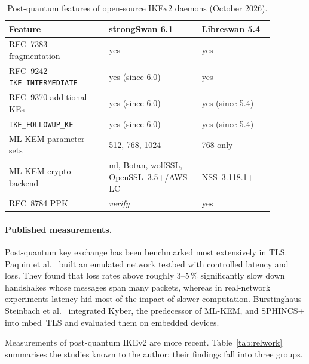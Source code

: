 \begin{table}[!h] \centering
    \caption{Post-quantum features of open-source IKEv2 daemons (October 2026).}
    \label{tab:impl}
    \begin{tabular}{| p{0.36\linewidth} | p{0.26\linewidth} | p{0.26\linewidth} |} \hline
        Feature & strongSwan 6.1 & Libreswan 5.4 \\ \hline\hline
        RFC~7383 fragmentation          & yes & yes \\ \hline
        RFC~9242 \texttt{IKE\_INTERMEDIATE} & yes (since 6.0) & yes \\ \hline
        RFC~9370 additional KEs         & yes (since 6.0) & yes (since 5.4) \\ \hline
        \texttt{IKE\_FOLLOWUP\_KE}      & yes (since 6.0) & yes (since 5.4) \\ \hline
        ML-KEM parameter sets           & 512, 768, 1024 & 768 only \\ \hline
        ML-KEM crypto backend           & ml, Botan, wolfSSL, OpenSSL~3.5+/AWS-LC & NSS~3.118.1+ \\ \hline
        RFC~8784 PPK                    & \textit{verify} & yes \\ \hline
    \end{tabular}
\end{table}

\paragraph{Published measurements.}
Post-quantum key exchange has been benchmarked most extensively in TLS.
Paquin et al.~\cite{paquin2020} built an emulated network testbed with
controlled latency and loss. They found that loss rates above roughly
3--5\,\% significantly slow down handshakes whose messages span many packets,
whereas in real-network experiments latency hid most of the impact of slower
computation.
Bürstinghaus-Steinbach et al.~\cite{burstinghaus2020} integrated Kyber, the
predecessor of ML-KEM, and SPHINCS+ into mbed~TLS and evaluated them on
embedded devices.

Measurements of post-quantum IKEv2 are more recent. Table~\ref{tab:relwork}
summarises the studies known to the author; their findings fall into three
groups.

